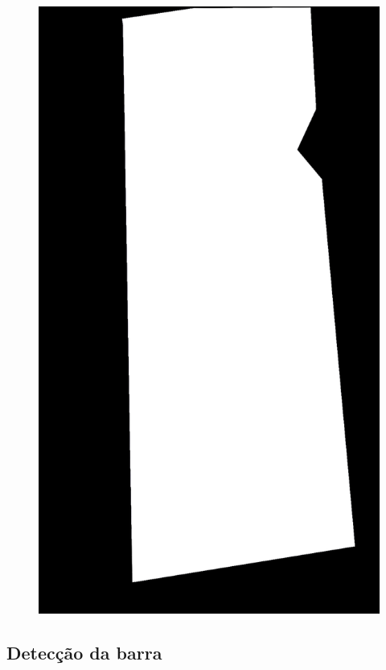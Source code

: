 \begin{figure}[htb]
\begin{minipage}{0.4\textwidth}
            \includegraphics[width=\textwidth]{figuras/filter/mask/mask.png}
        \end{minipage}
    \label{fig:maskAmbiente}
\end{figure}

\subsection[Detecção da barra]{Detecção da barra}\label{sec:Deteccao da barra}

